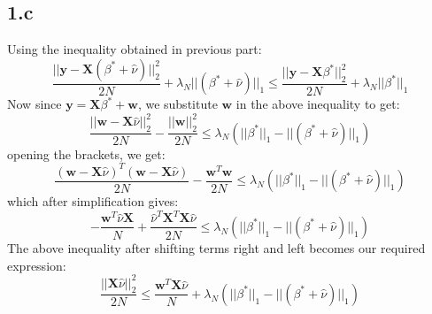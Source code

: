 \documentclass[12pt]{article}
\begin{document}
\subsection*{1.c}
Using the inequality obtained in previous part:
\begin{equation*}
    \frac{||\boldsymbol{y-X}(\beta^*+\hat{\nu})||^2_2}{2N}+\lambda_N||(\beta^*+\hat{\nu})||_1 \leq \frac{||\boldsymbol{y-X}\beta^*||^2_2}{2N}+\lambda_N||\beta^*||_1
\end{equation*}
Now since $\boldsymbol{y} = \boldsymbol{X}\beta^*+\boldsymbol{w}$, we substitute $\boldsymbol{w}$ in the above inequality to get:
\begin{equation*}
    \frac{||\boldsymbol{w}-\boldsymbol{X}\hat{\nu}||^2_2}{2N} - \frac{||\boldsymbol{w}||^2_2}{2N} \leq \lambda_N(||\beta^*||_1 - ||(\beta^*+\hat{\nu})||_1)
\end{equation*}
opening the brackets, we get:
\begin{equation*}
    \frac{(\boldsymbol{w}-\boldsymbol{X}\hat{\nu})^T(\boldsymbol{w}-\boldsymbol{X}\hat{\nu})}{2N} - \frac{\boldsymbol{w}^T\boldsymbol{w}}{2N} \leq \lambda_N(||\beta^*||_1 - ||(\beta^*+\hat{\nu})||_1)
\end{equation*}
which after simplification gives:
\begin{equation*}
    -\frac{\boldsymbol{w}^T\hat{\nu}\boldsymbol{X}}{N} + \frac{\hat{\nu}^T\boldsymbol{X}^T\boldsymbol{X}\hat{\nu}}{2N}\leq \lambda_N(||\beta^*||_1 - ||(\beta^*+\hat{\nu})||_1)
\end{equation*}
The above inequality after shifting terms right and left becomes our required expression:
\begin{equation*}
    \frac{||\boldsymbol{X}\hat{\nu}||^2_2}{2N}\leq \frac{\boldsymbol{w}^T\boldsymbol{X}\hat{\nu}}{N} + \lambda_N(||\beta^*||_1 - ||(\beta^*+\hat{\nu})||_1)
\end{equation*}
\end{document}
